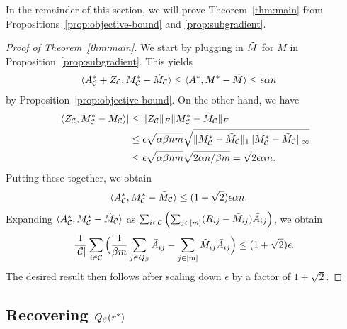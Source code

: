 In the remainder of this section, we will prove Theorem~\ref{thm:main} from Propositions~\ref{prop:objective-bound} 
and \ref{prop:subgradient}.
\begin{proof}[Proof of Theorem~\ref{thm:main}]
We start by plugging in $\tilde{M}$ for $M$ in Proposition~\ref{prop:subgradient}. This yields
\begin{align}
\langle A^*_{\mathcal{C}} + Z_{\mathcal{C}}, M^*_{\mathcal{C}} - \tilde{M}_{\mathcal{C}} \rangle &\leq \langle A^*, M^* - \tilde{M} \rangle 
 \leq \epsilon \alpha n
\end{align}
by Proposition~\ref{prop:objective-bound}.
On the other hand, we have 
\begin{align}
|\langle Z_{\mathcal{C}}, M^*_{\mathcal{C}} - \tilde{M}_{\mathcal{C}} \rangle| &\leq \|Z_{\mathcal{C}}\|_F\|M^*_{\mathcal{C}} - \tilde{M}_{\mathcal{C}}\|_F \\
 &\leq \epsilon\sqrt{\alpha\beta nm} \sqrt{\|M^*_{\mathcal{C}} - \tilde{M}_{\mathcal{C}}\|_{1}\|M^*_{\mathcal{C}} - \tilde{M}_{\mathcal{C}}\|_{\infty}} \\
 &\leq \epsilon\sqrt{\alpha\beta nm} \sqrt{2\alpha n/\beta m} = \sqrt{2}\epsilon\alpha n.
\end{align}
Putting these together, we obtain
\begin{align}
\langle A^*_{\mathcal{C}}, M^*_{\mathcal{C}} - \tilde{M}_{\mathcal{C}} \rangle &\leq (1+\sqrt{2})\epsilon \alpha n.
\end{align}
Expanding $\langle A^*_{\mathcal{C}}, M^*_{\mathcal{C}} - \tilde{M}_{\mathcal{C}} \rangle$ as 
$\sum_{i \in \mathcal{C}}\left( \sum_{j \in [m]} (R_{ij} - \tilde{M}_{ij})\bar{A}_{ij} \right)$,
we obtain 
\[ \frac{1}{|\mathcal{C}|}\sum_{i \in \mathcal{C}}\Big(\frac{1}{\beta m}\sum_{j \in Q_{\beta}} \bar{A}_{ij} - \sum_{j \in [m]} \tilde{M}_{ij}\bar{A}_{ij}\Big) \leq (1+\sqrt{2})\epsilon. \]
The desired result then follows after scaling down $\epsilon$ 
by a factor of $1+\sqrt{2}$.
\end{proof}

\subsection{Recovering $Q_{\beta}(r^*)$}
\label{sec:approach-r}

